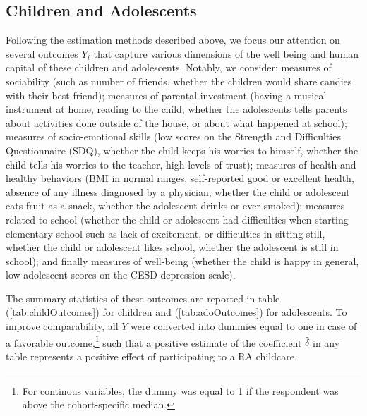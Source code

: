 \documentclass[12pt]{article}
\begin{document}
\subsection{Children and Adolescents}
Following the estimation methods described above, we focus our attention on several outcomes $Y_{i}$ that capture various dimensions of the well being and human capital of these children and adolescents. Notably, we consider: measures of sociability (such as number of friends, whether the children would share candies with their best friend); measures of parental investment (having a musical instrument at home, reading to the child, whether the adolescents tells parents about activities done outside of the house, or about what happened at school); measures of socio-emotional skills (low scores on the Strength and Difficulties Questionnaire (SDQ), whether the child keeps his worries to himself, whether the child tells his worries to the teacher, high levels of trust); measures of health and healthy behaviors (BMI in normal ranges, self-reported good or excellent health, absence of any illness diagnosed by a physician, whether the child or adolescent eats fruit as a snack, whether the adolescent drinks or ever smoked); measures related to school (whether the child or adolescent had difficulties when starting elementary school such as lack of excitement, or difficulties in sitting still, whether the child or adolescent likes school, whether the adolescent is still in school); and finally measures of well-being (whether the child is happy in general, low adolescent scores on the CESD depression scale).

The summary statistics of these outcomes are reported in table (\ref{tab:childOutcomes}) for children and (\ref{tab:adoOutcomes}) for adolescents. To improve comparability, all $Y$ were converted into dummies equal to one in case of a favorable outcome,\footnote{For continous variables, the dummy was equal to 1 if the respondent was above the cohort-specific median.} such that a positive estimate of the coefficient $\hat{\delta}$ in any table represents a positive effect of participating to a RA childcare.
\end{document}
